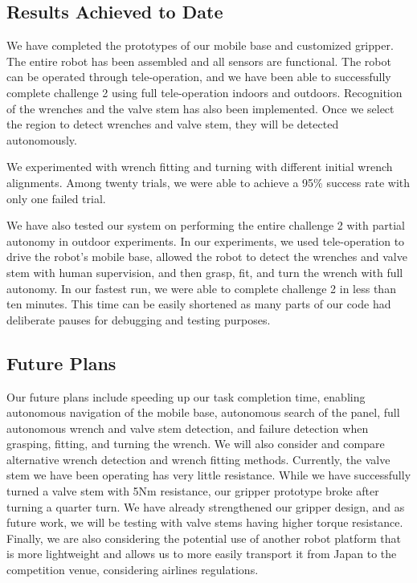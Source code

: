 \documentclass{standalone}
\begin{document}
\subsection{Results Achieved to Date}
We have completed the prototypes of our mobile base and customized gripper. The entire robot has been assembled and all sensors are functional. The robot can be operated through tele-operation, and we have been able to successfully complete challenge 2 using full tele-operation indoors and outdoors. 
Recognition of the wrenches and the valve stem has also been implemented. Once we select the region to detect wrenches and valve stem, they will be detected autonomously.

We experimented with wrench fitting and turning with different initial wrench alignments. Among twenty trials, we were able to achieve a 95$\%$ success rate with only one failed trial. 

We have also tested our system on performing the entire challenge 2 with partial autonomy in outdoor experiments. In our experiments, we used tele-operation to drive the robot's mobile base, allowed the robot to detect the wrenches and valve stem with human supervision, and then grasp, fit, and turn the wrench with full autonomy. In our fastest run, we were able to complete challenge 2 in less than ten minutes. This time can be easily shortened as many parts of our code had deliberate pauses for debugging and testing purposes.

\subsection{Future Plans}
Our future plans include speeding up our task completion time, enabling autonomous navigation of the mobile base, autonomous search of the panel, full autonomous wrench and valve stem detection, and failure detection when grasping, fitting, and turning the wrench. We will also consider and compare alternative wrench detection and wrench fitting methods. Currently, the valve stem we have been operating has very little resistance. While we have successfully turned a valve stem with 5Nm resistance, our gripper prototype broke after turning a quarter turn. We have already strengthened our gripper design, and as future work, we will be testing with valve stems having higher torque resistance.  Finally, we are also considering the potential use of another robot platform that is more lightweight and allows us to more easily transport it from Japan to the competition venue, considering airlines regulations. 
\end{document}
